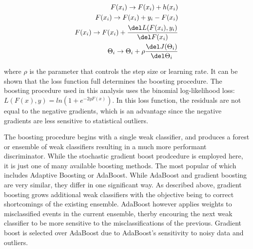 \begin{equation}
\begin{aligned}
\label{eqn:residual1}
F(x_{i}) \rightarrow F(x_{i}) + h(x_{i}) \\ F(x_{i}) \rightarrow F(x_{i}) + y_{i} - F(x_{i}) \\ F(x_{i}) \rightarrow F(x_{i}) + \frac{\del L(F(x_{i}),y_{i})}{\del F(x_{i})} \\ \Theta_{i} \rightarrow \Theta_{i} + \rho\frac{\del J(\Theta_{i})}{\del \Theta_{i}}
\end{aligned} 
\end{equation}

\noindent where $\rho$ is the parameter that controls the step size or learning rate. It can be shown that the loss function full determines the boosting procedure. The boosting procedure
used in this analysis uses the binomial log-likelihood loss: $L(F(x),y) = ln(1+e^{-2yF(x)})$. In this loss function, the residuals are not equal to the negative gradients, which
is an advantage since the negative gradients are less sensitive to statistical outliers.

The boosting procedure begins with a single weak classifier, and produces a forest or ensemble of weak classifiers resulting in a much more performant discriminator. While the stochastic
gradient boost prodcedure is employed here, it is just one of many available boosting methods. The most popular of which includes Adaptive Boosting or AdaBoost. While AdaBoost and
gradient boosting are very similar, they differ in one significant way. As described above, gradient boosting grows additional weak classifiers with the objective being to correct
shortcomings of the existing ensemble. AdaBoost however applies weights to misclassified events in the current ensemble, therby encouring the next weak classifier to be more sensitive
to the misclassifications of the previous. Gradient boost is selected over AdaBoost due to AdaBoost's sensitivity to noisy data and outliers. 

